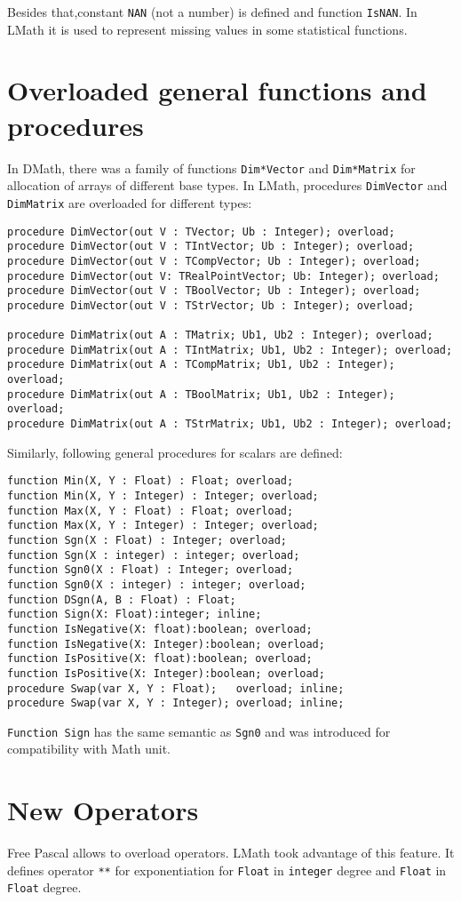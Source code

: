 \documentclass[12pt,a4paper,oneside]{report}
\newcommand{\code}[1]{\texttt{#1}}
\begin{document}
Besides that,constant \code{NAN} (not a number) is defined and function \code{IsNAN}. In LMath it is used to represent missing values in some statistical functions.
\section{Overloaded general functions and procedures}
In DMath, there was a family of functions \code{Dim*Vector} and \code{Dim*Matrix} for allocation of arrays of different base types. In LMath, procedures \code{DimVector} and \code{DimMatrix} are overloaded for different types:
\begin{lstlisting}
procedure DimVector(out V : TVector; Ub : Integer); overload;
procedure DimVector(out V : TIntVector; Ub : Integer); overload;
procedure DimVector(out V : TCompVector; Ub : Integer); overload;
procedure DimVector(out V: TRealPointVector; Ub: Integer); overload;
procedure DimVector(out V : TBoolVector; Ub : Integer); overload;
procedure DimVector(out V : TStrVector; Ub : Integer); overload;
	
procedure DimMatrix(out A : TMatrix; Ub1, Ub2 : Integer); overload;
procedure DimMatrix(out A : TIntMatrix; Ub1, Ub2 : Integer); overload;
procedure DimMatrix(out A : TCompMatrix; Ub1, Ub2 : Integer); overload;
procedure DimMatrix(out A : TBoolMatrix; Ub1, Ub2 : Integer); overload;
procedure DimMatrix(out A : TStrMatrix; Ub1, Ub2 : Integer); overload;
\end{lstlisting} 
Similarly, following general procedures for scalars are defined:
\begin{lstlisting}
function Min(X, Y : Float) : Float; overload;
function Min(X, Y : Integer) : Integer; overload;
function Max(X, Y : Float) : Float; overload;
function Max(X, Y : Integer) : Integer; overload;
function Sgn(X : Float) : Integer; overload;
function Sgn(X : integer) : integer; overload; 
function Sgn0(X : Float) : Integer; overload; 
function Sgn0(X : integer) : integer; overload; 
function DSgn(A, B : Float) : Float;
function Sign(X: Float):integer; inline;
function IsNegative(X: float):boolean; overload;
function IsNegative(X: Integer):boolean; overload;
function IsPositive(X: float):boolean; overload;
function IsPositive(X: Integer):boolean; overload; 
procedure Swap(var X, Y : Float);   overload; inline;
procedure Swap(var X, Y : Integer); overload; inline;
\end{lstlisting}
\code{Function Sign} has the same semantic as \code{Sgn0} and was introduced for compatibility with Math unit.
\section{New Operators}
Free Pascal allows to overload operators. LMath took advantage of this feature. It defines operator \code{**} for exponentiation for \code{Float} in \code{integer} degree and \code{Float} in \code{Float} degree.
\end{document}

